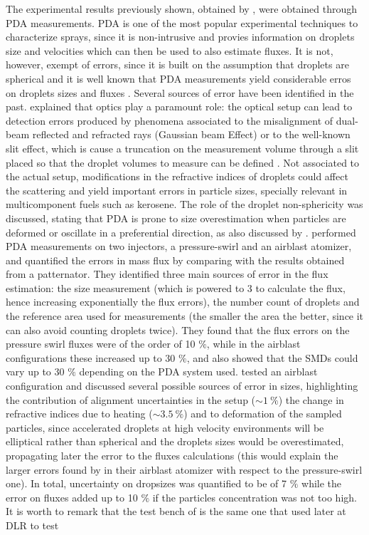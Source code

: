 The experimental results previously shown, obtained by , were obtained through PDA measurements. PDA is one of the most popular experimental techniques to characterize sprays, since it is non-intrusive and provies information on droplets size and velocities which can then be used to also estimate fluxes. It is not, however, exempt of errors, since it is built on the assumption that droplets are spherical and it is well known that PDA measurements yield considerable erros on droplets sizes and fluxes . Several sources of error have been identified in the past.  explained that optics play a paramount role: the optical setup can lead to detection errors produced by phenomena associated to the misalignment of dual-beam reflected and refracted rays (Gaussian beam Effect) or to the well-known slit effect, which is cause a truncation on the measurement volume through a slit placed so that the droplet volumes to measure can be defined . Not associated to the actual setup, modifications in the refractive indices of droplets could affect the scattering and yield important errors in particle sizes, specially relevant in multicomponent fuels such as kerosene. The role of the droplet non-sphericity was discussed, stating that PDA is prone to size overestimation when particles are deformed or oscillate in a preferential direction, as also discussed by .  performed PDA measurements on two injectors, a pressure-swirl and an airblast atomizer, and quantified the errors in mass flux by comparing with the results obtained from a patternator. They identified three main sources of error in the flux estimation: the size measurement (which is powered to 3 to calculate the flux, hence increasing exponentially the flux errors), the number count of droplets and the reference area used for measurements (the smaller the area the better, since it can also avoid counting droplets twice). They found that the flux errors on the pressure swirl fluxes were of the order of 10 $\%$, while in the airblast configurations these increased up to 30 $\%$, and also showed that the SMDs could vary up to 30 $\%$ depending on the PDA system used.  tested an airblast configuration and discussed several possible sources of error in sizes, highlighting the contribution of alignment uncertainties in the setup ($\sim 1~\%$) the change in refractive indices due to heating ($\sim 3.5~\%$) and to deformation of the sampled particles, since accelerated droplets at high velocity environments will be elliptical rather than spherical and the droplets sizes would be overestimated, propagating later the error to the fluxes calculations (this would explain the larger errors found by  in their airblast atomizer with respect to the pressure-swirl one). In total, uncertainty on dropsizes was quantified to be of 7 $\%$ while the error on fluxes added up to 10 $\%$ if the particles concentration was not too high. It is worth to remark that the test bench of  is the same one that  used later at DLR to test 